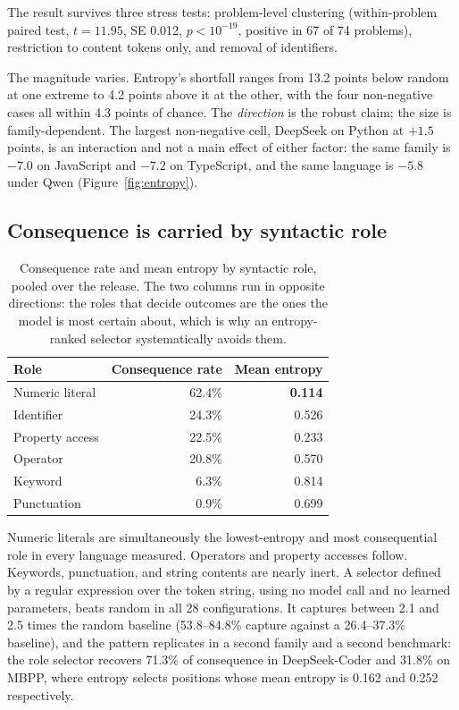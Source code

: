 \documentclass[twoside,11pt]{article}
\begin{document}
The result survives three stress tests: problem-level clustering (within-problem paired test, $t = 11.95$, SE 0.012, $p < 10^{-19}$, positive in 67 of 74 problems), restriction to content tokens only, and removal of identifiers.

The magnitude varies. Entropy's shortfall ranges from 13.2 points below random at one extreme to 4.2 points above it at the other, with the four non-negative cases all within 4.3 points of chance. The \emph{direction} is the robust claim; the size is
family-dependent. The largest non-negative cell, DeepSeek on Python at $+1.5$ points, is an
interaction and not a main effect of either factor: the same family is $-7.0$ on JavaScript and
$-7.2$ on TypeScript, and the same language is $-5.8$ under Qwen (Figure~\ref{fig:entropy}).

\subsection{Consequence is carried by syntactic role}

\begin{table}[h]
\centering
\begin{tabular}{lrr}
\toprule
Role & Consequence rate & Mean entropy \\
\midrule
Numeric literal & 62.4\% & \textbf{0.114} \\
Identifier & 24.3\% & 0.526 \\
Property access & 22.5\% & 0.233 \\
Operator & 20.8\% & 0.570 \\
Keyword & 6.3\% & 0.814 \\
Punctuation & 0.9\% & 0.699 \\
\bottomrule
\end{tabular}
\caption{Consequence rate and mean entropy by syntactic role, pooled over the release. The two
columns run in opposite directions: the roles that decide outcomes are the ones the model is most
certain about, which is why an entropy-ranked selector systematically avoids them.}
\label{tab:roles}
\end{table}

Numeric literals are simultaneously the lowest-entropy and most consequential role in every language measured. Operators and property accesses follow. Keywords, punctuation, and string contents are nearly inert. A selector defined by a regular expression over the token string, using no model call and no learned parameters, beats random in all 28 configurations. It captures between 2.1 and 2.5 times the random baseline (53.8--84.8\% capture against a
26.4--37.3\% baseline), and the pattern replicates in a second family and a second benchmark: the
role selector recovers 71.3\% of consequence in DeepSeek-Coder and 31.8\% on MBPP, where entropy
selects positions whose mean entropy is 0.162 and 0.252 respectively.
\end{document}

